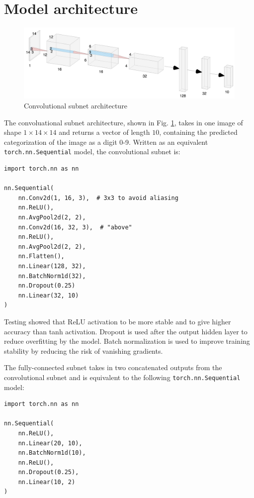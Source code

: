 \documentclass[prl, article, twocolumn]{revtex4-1}
\begin{document}
\section{Model architecture}
\begin{figure}[h!]
    \centering
    \includegraphics[width=\linewidth]{figures/LeNet.png}
    \caption{Convolutional subnet architecture}
    \label{fig:lenet}
\end{figure}

The convoluational subnet architecture, shown in Fig. \ref{fig:lenet}, takes in one image of shape $1 \times 14 \times 14$ and returns a vector of length $10$, containing the predicted categorization of the image as a digit 0-9. Written as an equivalent \texttt{torch.nn.Sequential} model, the convolutional subnet is:

\begin{verbatim}
import torch.nn as nn

nn.Sequential(
    nn.Conv2d(1, 16, 3),  # 3x3 to avoid aliasing
    nn.ReLU(),
    nn.AvgPool2d(2, 2),
    nn.Conv2d(16, 32, 3),  # "above"
    nn.ReLU(),
    nn.AvgPool2d(2, 2),
    nn.Flatten(),
    nn.Linear(128, 32),
    nn.BatchNorm1d(32),
    nn.Dropout(0.25)
    nn.Linear(32, 10)
)
\end{verbatim}

Testing showed that ReLU activation to be more stable and to give higher accuracy than tanh activation. Dropout is used after the output hidden layer to reduce overfitting by the model. Batch normalization is used to improve training stability by reducing the risk of vanishing gradients.

The fully-connected subnet takes in two concatenated outputs from the convolutional subnet and is equivalent to the following \texttt{torch.nn.Sequential} model:

\begin{verbatim}
import torch.nn as nn

nn.Sequential(
    nn.ReLU(),
    nn.Linear(20, 10),
    nn.BatchNorm1d(10),
    nn.ReLU(),
    nn.Dropout(0.25),
    nn.Linear(10, 2)
)
\end{verbatim}
\end{document}
